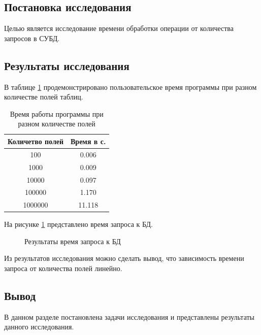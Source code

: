 \subsection{Постановка исследования}

Целью является исследование времени обработки операции от количества запросов в
СУБД.

\subsection{Результаты исследования}

В таблице \ref{tab:time1} продемонстрировано пользовательское время программы
при разном количестве полей таблиц.

\begin{table}[ht!]
	\begin{center}

		\caption{Время работы программы при разном
			количестве
			полей}
		\label{tab:time1}
		\begin{tabular}{|c|c|}
			\hline
			Количетво полей & Время в с. \\
			\hline
			100             & 0.006      \\
			\hline
			1000            & 0.009      \\
			\hline
			10000           & 0.097      \\
			\hline
			100000          & 1.170      \\
			\hline
			1000000         & 11.118     \\
			\hline

		\end{tabular}
	\end{center}
\end{table}
\newpage
На рисунке \ref{graph:r} представлено время запроса к БД.

\begin{figure}[ht!]
	\begin{center}
		\captionsetup{singlelinecheck = false,
			justification=centerfirst}
		\centering
		\caption{Результаты время запроса к БД}
		\label{graph:r}
	\end{center}
\end{figure}

Из результатов исследования можно сделать вывод, что зависимость времени запроса от количества полей линейно.

\subsection*{Вывод}

В данном разделе постановлена задачи исследования и представлены результаты
данного исследования.